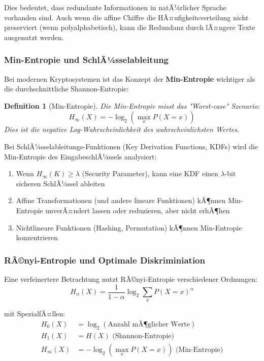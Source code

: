 ﻿\documentclass[12pt,a4paper]{article}
\newtheorem{definition}{Definition}
\begin{document}
	Dies bedeutet, dass redundante Informationen in natÃ¼rlicher Sprache vorhanden sind. Auch wenn die affine Chiffre die HÃ¤ufigkeitsverteilung nicht preserviert (wenn polyalphabetisch), kann die Redundanz durch lÃ¤ngere Texte ausgenutzt werden.
	
	\subsubsection{Min-Entropie und SchlÃ¼sselableitung}
	
	Bei modernen Kryptosystemen ist das Konzept der \textbf{Min-Entropie} wichtiger als die durchschnittliche Shannon-Entropie:
	
	\begin{definition}[Min-Entropie]
		Die Min-Entropie misst das "Worst-case" Szenario:
		\begin{equation}
			H_\infty(X) = -\log_2(\max_x P(X = x))
		\end{equation}
		Dies ist die negative Log-Wahrscheinlichkeit des wahrscheinlichsten Wertes.
	\end{definition}
	
	Bei SchlÃ¼sselableitungs-Funktionen (Key Derivation Functions, KDFs) wird die Min-Entropie des EingabeschlÃ¼ssels analysiert:
	\begin{enumerate}
		\item Wenn $H_\infty(K) \geq \lambda$ (Security Parameter), kann eine KDF einen $\lambda$-bit sicheren SchlÃ¼ssel ableiten
		\item Affine Transformationen (und andere lineare Funktionen) kÃ¶nnen Min-Entropie unverÃ¤ndert lassen oder reduzieren, aber nicht erhÃ¶hen
		\item Nichtlineare Funktionen (Hashing, Permutation) kÃ¶nnen Min-Entropie konzentrieren
	\end{enumerate}
	
	\subsubsection{RÃ©nyi-Entropie und Optimale Diskriminiation}
	
	Eine verfeinertere Betrachtung nutzt RÃ©nyi-Entropie verschiedener Ordnungen:
	\begin{equation}
		H_\alpha(X) = \frac{1}{1-\alpha} \log_2 \sum_x P(X=x)^\alpha
	\end{equation}
	
	mit SpezialfÃ¤llen:
	\begin{align}
		H_0(X) &= \log_2(\text{Anzahl mÃ¶glicher Werte}) \\
		H_1(X) &= H(X) \text{ (Shannon-Entropie)} \\
		H_\infty(X) &= -\log_2(\max_x P(X=x)) \text{ (Min-Entropie)}
	\end{align}
	
\end{document}
